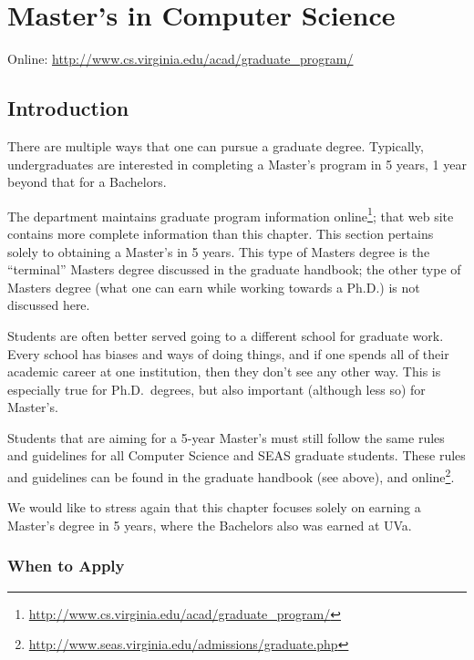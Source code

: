 \documentclass[10pt,letter,twocolumn]{book}
\newcommand{\mychapter}[2]{\chapter{#1}\renewcommand{\leftmark}{\textsc{#2}}}
\newcommand{\mysection}[1]{\section{#1}\renewcommand{\rightmark}{#1}}
\newcommand{\myurl}[1]{\footnote{\scriptsize\url{#1}}}
\begin{document}
\clearpage
\mychapter{Master's in Computer Science}{Masters in CS}

\noindent Online: \url{http://www.cs.virginia.edu/acad/graduate_program/}




\mysection{Introduction}

There are multiple ways that one can pursue a graduate degree.
Typically, undergraduates are interested in completing a Master's
program in 5 years, 1 year beyond that for a Bachelors.

The department maintains graduate program information
online\myurl{http://www.cs.virginia.edu/acad/graduate_program/}; that
web site contains more complete information than this chapter.  This
section pertains solely to obtaining a Master's in 5 years.  This type
of Masters degree is the ``terminal'' Masters degree discussed in the
graduate handbook; the other type of Masters degree (what one can earn
while working towards a Ph.D.) is not discussed here.

Students are often better served going to a different school for
graduate work.  Every school has biases and ways of doing things, and
if one spends all of their academic career at one institution, then
they don't see any other way.  This is especially true for
Ph.D.\ degrees, but also important (although less so) for Master's.

Students that are aiming for a 5-year Master's must still follow the
same rules and guidelines for all Computer Science and SEAS graduate
students.  These rules and guidelines can be found in the graduate
handbook (see above), and
online\myurl{http://www.seas.virginia.edu/admissions/graduate.php}.

We would like to stress again that this chapter focuses solely on
earning a Master's degree in 5 years, where the Bachelors also was
earned at UVa.


\subsection{When to Apply}
\end{document}

